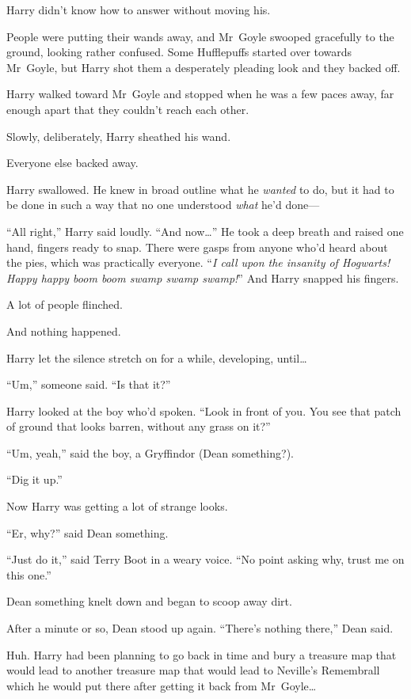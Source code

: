 Harry didn’t know how to answer without moving his.

People were putting their wands away, and Mr~Goyle swooped gracefully to the ground, looking rather confused. Some Hufflepuffs started over towards Mr~Goyle, but Harry shot them a desperately pleading look and they backed off.

Harry walked toward Mr~Goyle and stopped when he was a few paces away, far enough apart that they couldn’t reach each other.

Slowly, deliberately, Harry sheathed his wand.

Everyone else backed away.

Harry swallowed. He knew in broad outline what he \emph{wanted} to do, but it had to be done in such a way that no one understood \emph{what} he’d done—

“All right,” Harry said loudly. “And now…” He took a deep breath and raised one hand, fingers ready to snap. There were gasps from anyone who’d heard about the pies, which was practically everyone. “\emph{I call upon the insanity of Hogwarts! Happy happy boom boom swamp swamp swamp!}” And Harry snapped his fingers.

A lot of people flinched.

And nothing happened.

Harry let the silence stretch on for a while, developing, until…

“Um,” someone said. “Is that it?”

Harry looked at the boy who’d spoken. “Look in front of you. You see that patch of ground that looks barren, without any grass on it?”

“Um, yeah,” said the boy, a Gryffindor (Dean something?).

“Dig it up.”

Now Harry was getting a lot of strange looks.

“Er, why?” said Dean something.

“Just do it,” said Terry Boot in a weary voice. “No point asking why, trust me on this one.”

Dean something knelt down and began to scoop away dirt.

After a minute or so, Dean stood up again. “There’s nothing there,” Dean said.

Huh. Harry had been planning to go back in time and bury a treasure map that would lead to another treasure map that would lead to Neville’s Remembrall which he would put there after getting it back from Mr~Goyle…

